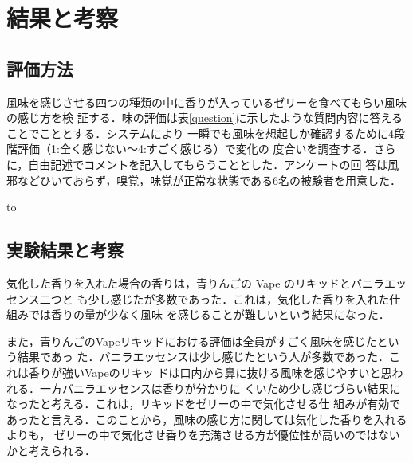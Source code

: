 \section{結果と考察}

\subsection{評価方法}

風味を感じさせる四つの種類の中に香りが入っているゼリーを食べてもらい風味の感じ方を検
証する．味の評価は表\ref{question}に示したような質問内容に答えることでこととする．システムにより
一瞬でも風味を想起しか確認するために4段階評価（1:全く感じない～4:すごく感じる）で変化の
度合いを調査する．さらに，自由記述でコメントを記入してもらうこととした．アンケートの回
答は風邪などひいておらず，嗅覚，味覚が正常な状態である6名の被験者を用意した．


\begin{table}[t]
    \caption{質問内容}
    \label{question}
    \hbox to
    \end{table}


\subsection{実験結果と考察}

気化した香りを入れた場合の香りは，青りんごの Vape のリキッドとバニラエッセンス二つと
も少し感じたが多数であった．これは，気化した香りを入れた仕組みでは香りの量が少なく風味
を感じることが難しいという結果になった．


また，青りんごのVapeリキッドにおける評価は全員がすごく風味を感じたという結果であっ
た．バニラエッセンスは少し感じたという人が多数であった．これは香りが強いVapeのリキッ
ドは口内から鼻に抜ける風味を感じやすいと思われる．一方バニラエッセンスは香りが分かりに
くいため少し感じづらい結果になったと考える．これは，リキッドをゼリーの中で気化させる仕
組みが有効であったと言える．このことから，風味の感じ方に関しては気化した香りを入れるよりも，
ゼリーの中で気化させ香りを充満させる方が優位性が高いのではないかと考えられる．


